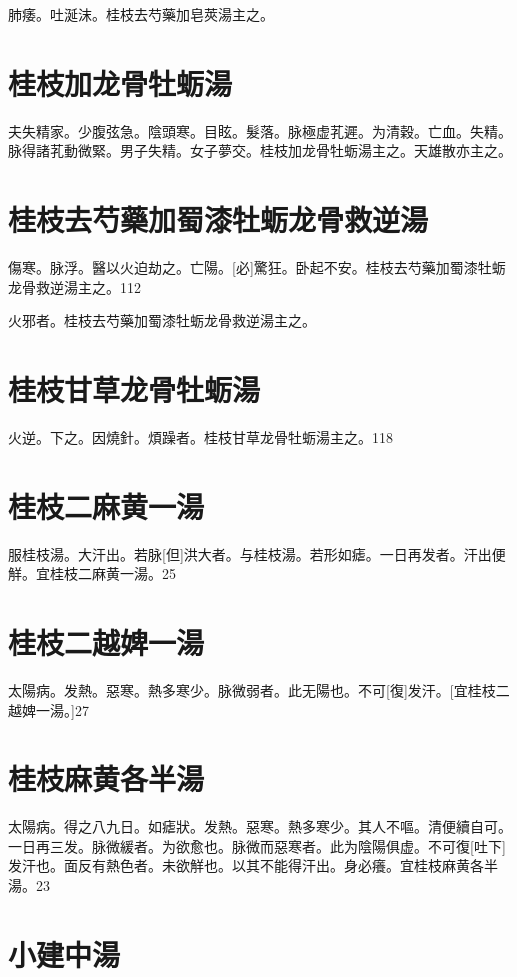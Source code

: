 \documentclass[12pt,oneside,UTF8,b5paper]{ctexbook}她她她她她她她
\begin{document}
肺痿。吐涎沫。桂枝去芍藥加皂莢湯主之。

\section{桂枝加龙骨牡蛎湯}

夫失精家。少腹弦急。陰頭寒。目眩。髮落。脉極虚芤遲。为清穀。亡血。失精。脉得諸芤動微緊。男子失精。女子夢交。桂枝加龙骨牡蛎湯主之。天雄散亦主之。

\section{桂枝去芍藥加蜀漆牡蛎龙骨救逆湯}

傷寒。脉浮。醫以火迫劫之。亡陽。[必]驚狂。卧起不安。桂枝去芍藥加蜀漆牡蛎龙骨救逆湯主之。112

火邪者。桂枝去芍藥加蜀漆牡蛎龙骨救逆湯主之。

\section{桂枝甘草龙骨牡蛎湯}

火逆。下之。因燒針。煩躁者。桂枝甘草龙骨牡蛎湯主之。118

\section{桂枝二麻黄一湯}

服桂枝湯。大汗出。若脉[但]洪大者。与桂枝湯。若形如瘧。一日再发者。汗出便觧。宜桂枝二麻黄一湯。25

\section{桂枝二越婢一湯}

太陽病。发熱。惡寒。熱多寒少。脉微弱者。此无陽也。不可[復]发汗。[宜桂枝二越婢一湯。]27

\section{桂枝麻黄各半湯}

太陽病。得之八九日。如瘧狀。发熱。惡寒。熱多寒少。其人不嘔。清便續自可。一日再三发。脉微緩者。为欲愈也。脉微而惡寒者。此为陰陽俱虚。不可復[吐下]发汗也。面反有熱色者。未欲觧也。以其不能得汗出。身必癢。宜桂枝麻黄各半湯。23

\section{小建中湯}
\end{document}
